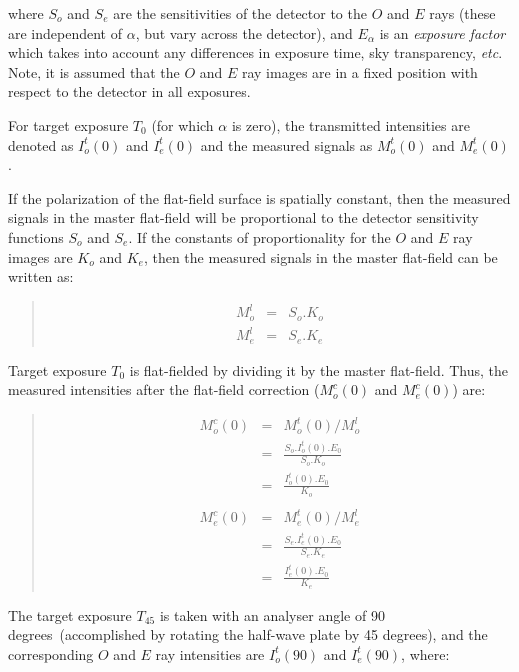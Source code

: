 \documentclass[twoside,11pt]{article}
\renewcommand{\_}{\texttt{\symbol{95}}}
\newenvironment{myquote}{\begin{quote}\begin{small}}{\end{small}\end{quote}}
\newcommand{\dgs}{\hbox{$^\circ$}}
\renewcommand{\dgs}{ degrees}
\begin{document}
where $S_{o}$ and $S_{e}$ are the sensitivities of the detector to the $O$ 
and $E$ rays (these are independent of $\alpha$, but vary across the
detector), and $E_{\alpha}$ is an \emph{exposure factor} which takes into
account any differences in exposure time, sky transparency, \emph{etc}. Note, it
is assumed that the $O$ and $E$ ray images are in a fixed position
with respect to the detector in all exposures.

For target exposure $T_{0}$ (for which $\alpha$ is zero), the transmitted
intensities are denoted as $I^{t}_{o}(0)$ and $I^{t}_{e}(0)$ and the
measured signals as $M^{t}_{o}(0)$ and $M^{t}_{e}(0)$. 

If the polarization of the flat-field surface is spatially constant, then
the measured signals in the master flat-field will be proportional to
the detector sensitivity functions $S_{o}$ and $S_{e}$. If the constants
of proportionality for the $O$ and $E$ ray images are $K_{o}$ and
$K_{e}$, then the measured signals in the master flat-field can be
written as:

\begin{myquote}
\begin{eqnarray*}
  M^l_{o} & = & S_{o}.K_{o} \\
  M^l_{e} & = & S_{e}.K_{e}
\end{eqnarray*}
\end{myquote}

Target exposure $T_{0}$ is flat-fielded by dividing it by the master 
flat-field. Thus, the measured intensities after the flat-field correction
($M^{c}_{o}(0)$ and $M^{c}_{e}(0)$) are:

\begin{myquote}
\begin{eqnarray*}
  M^{c}_{o}(0) & = & M^{t}_{o}(0) / M^{l}_{o} \\
                    & = & \frac{ S_{o}.I^{t}_{o}(0).E_{0} }{ S_{o}.K_{o} } \\
                    & = & \frac{ I^{t}_{o}(0).E_{0} }{ K_{o} } \\ \\
  M^{c}_{e}(0) & = & M^{t}_{e}(0) / M^{l}_{e} \\
                    & = & \frac{ S_{e}.I^{t}_{e}(0).E_{0} }{ S_{e}.K_{e} } \\
                    & = & \frac{ I^{t}_{e}(0).E_{0} }{ K_{e} } 
\end{eqnarray*}
\end{myquote}

The target exposure $T_{45}$ is taken with an analyser angle of 90\dgs\
(accomplished by rotating the half-wave plate by 45\dgs), and the
corresponding $O$ and $E$ ray intensities are $I^{t}_{o}(90)$ and
$I^{t}_{e}(90)$, where:
\end{document}
